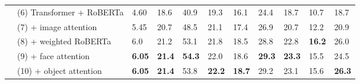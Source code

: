 \begin{table*}[t]
\begin{tabularx}{\textwidth}{llXXX XX XX XX}
		 & (6) Transformer + RoBERTa                         & 4.60          & 18.6          & 40.9          & 19.3          & 16.1          & 24.4          & 18.7          & 10.7          & 18.7          \\
		 & (7) \quad + image attention                       & 5.45          & 20.7          & 48.5          & 21.1          & 17.4          & 26.9          & 20.7          & 12.2          & 20.9          \\
		 & (8) \quad\quad + weighted RoBERTa                 & 6.0           & 21.2          & 53.1          & 21.8          & 18.5          & 28.8          & 22.8          & \textbf{16.2} & 26.0          \\
		 & (9) \quad\quad\quad + face attention              & \textbf{6.05} & \textbf{21.4} & \textbf{54.3} & 22.0          & 18.6          & \textbf{29.3} & \textbf{23.3} & 15.5          & 24.5          \\
		 & (10) \quad\quad\quad\quad + object attention      & \textbf{6.05} & \textbf{21.4} & 53.8          & \textbf{22.2} & \textbf{18.7} & 29.2          & 23.1          & 15.6 & \textbf{26.3} \\



\end{tabularx}
\end{table*}
